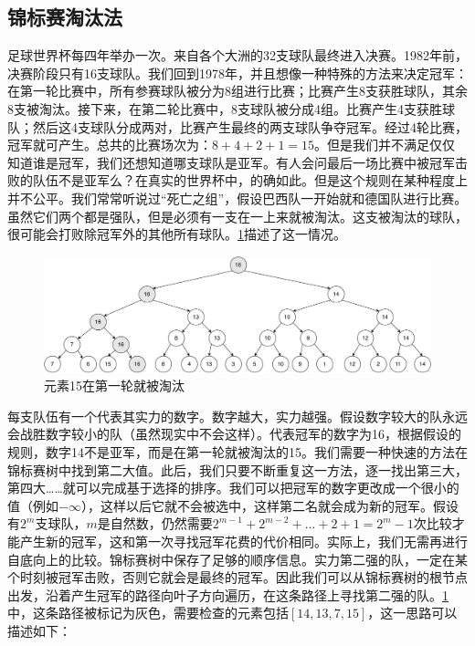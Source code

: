 \documentclass[b5paper]{ctexart}
\begin{document}
\subsection{锦标赛淘汰法}

足球世界杯每四年举办一次。来自各个大洲的32支球队最终进入决赛。1982年前，决赛阶段只有16支球队。我们回到1978年，并且想像一种特殊的方法来决定冠军：在第一轮比赛中，所有参赛球队被分为8组进行比赛；比赛产生8支获胜球队，其余8支被淘汰。接下来，在第二轮比赛中，8支球队被分成4组。比赛产生4支获胜球队；然后这4支球队分成两对，比赛产生最终的两支球队争夺冠军。经过4轮比赛，冠军就可产生。总共的比赛场次为：$8+4+2+1 = 15$。但是我们并不满足仅仅知道谁是冠军，我们还想知道哪支球队是亚军。有人会问最后一场比赛中被冠军击败的队伍不是亚军么？在真实的世界杯中，的确如此。但是这个规则在某种程度上并不公平。我们常常听说过“死亡之组”，假设巴西队一开始就和德国队进行比赛。虽然它们两个都是强队，但是必须有一支在一上来就被淘汰。这支被淘汰的球队，很可能会打败除冠军外的其他所有球队。\cref{fig:tournament-tree-1}描述了这一情况。

\begin{figure}[htbp]
  \centering
  \includegraphics[scale=0.28]{img/tournament-tree-1}
  \caption{元素15在第一轮就被淘汰}
  \label{fig:tournament-tree-1}
\end{figure}

每支队伍有一个代表其实力的数字。数字越大，实力越强。假设数字较大的队永远会战胜数字较小的队（虽然现实中不会这样）。代表冠军的数字为16，根据假设的规则，数字14不是亚军，而是在第一轮就被淘汰的15。我们需要一种快速的方法在锦标赛树中找到第二大值。此后，我们只要不断重复这一方法，逐一找出第三大，第四大……就可以完成基于选择的排序。我们可以把冠军的数字更改成一个很小的值（例如$-\infty$），这样以后它就不会被选中，这样第二名就会成为新的冠军。假设有$2^m$支球队，$m$是自然数，仍然需要$2^{m-1} + 2^{m-2} + ... + 2 + 1 = 2^m-1$次比较才能产生新的冠军，这和第一次寻找冠军花费的代价相同。实际上，我们无需再进行自底向上的比较。锦标赛树中保存了足够的顺序信息。实力第二强的队，一定在某个时刻被冠军击败，否则它就会是最终的冠军。因此我们可以从锦标赛树的根节点出发，沿着产生冠军的路径向叶子方向遍历，在这条路径上寻找第二强的队。\cref{fig:tournament-tree-1}中，这条路径被标记为灰色，需要检查的元素包括$[14, 13, 7, 15]$，这一思路可以描述如下：
\end{document}
